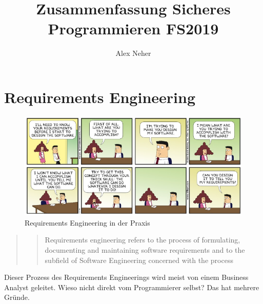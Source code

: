 \documentclass[a4paper, 11pt]{article}
\begin{document}
\title{Zusammenfassung Sicheres Programmieren FS2019}
\author{Alex Neher}
\maketitle

\tableofcontents

\newpage
\graphicspath{{./Pictures/}}

\restoregeometry

\section{Requirements Engineering}

\begin{figure}[htb]
	\centering
	\includegraphics[keepaspectratio=true,height=15\baselineskip]{req_engineering.png}
	\caption{Requirements Engineering in der Praxis}
    \label{fig:req_eng}
\end{figure}

\begin{quote}
     \centering
     \blockquote{Requirements engineering refers to the process of formulating, documenting and maintaining software requirements and to the subfield of Software Engineering concerned with the process}
\end{quote}


Dieser Prozess des Requirements Engineerings wird meist von einem Business Analyst geleitet. Wieso nicht direkt vom Programmierer selbst? Das hat mehrere Gründe. 
\end{document}
